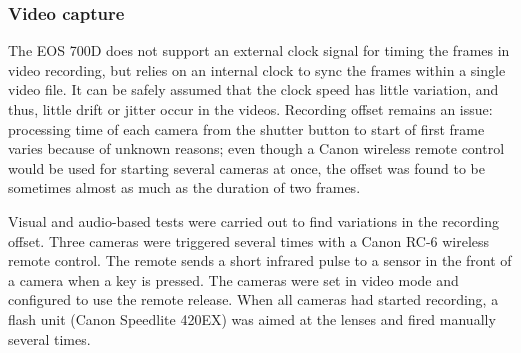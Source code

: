
%

\subsubsection{Video capture}


The EOS 700D does not support an external clock signal for timing the frames in video recording, but relies on an internal clock to sync the frames within a single video file.
It can be safely assumed that the clock speed has little variation, and thus, little drift or jitter occur in the videos.
Recording offset remains an issue:
processing time of each camera from the shutter button to start of first frame varies because of unknown reasons; even though a Canon wireless remote control would be used for starting several cameras at once, the offset was found to be sometimes almost as much as the duration of two frames.


Visual and audio-based tests were carried out to find variations in the recording offset.
Three cameras were triggered several times with a Canon RC-6 wireless remote control.
The remote sends a short infrared pulse to a sensor in the front of a camera when a key is pressed.
The cameras were set in video mode and configured to use the remote release.
When all cameras had started recording, a flash unit (Canon Speedlite 420EX) was aimed at the lenses and fired manually several times.

